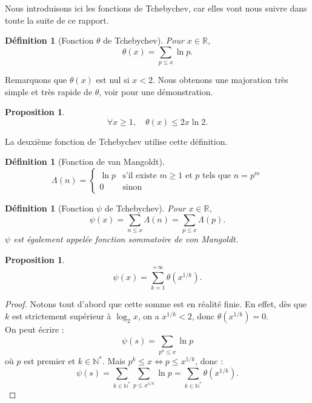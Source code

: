 \documentclass[french]{report}
\newtheorem{definition}[theorem]{Définition}
\newtheorem{proposition}[theorem]{Proposition}
\begin{document}
Nous introduisons ici les fonctions de Tchebychev, car elles vont nous suivre dans toute la suite de ce rapport.

\begin{definition}[Fonction $\theta$ de Tchebychev] Pour $x\in \mathbb{R}$,
  \[ \theta(x) = \sum_{p \le x}\ln p. \]
\end{definition}

Remarquons que $\theta(x)$ est nul si $x<2$. Nous obtenons une majoration très simple et très rapide de $\theta$, voir \cite{hindry} pour une démonstration.

\begin{proposition}\label{prop:theta-majoration}
  \[
    \forall x\geq1,\quad \theta(x)\leq 2x\ln 2.
  \]
\end{proposition}

La deuxième fonction de Tchebychev utilise cette définition.

\begin{definition}[Fonction de van Mangoldt]
  \[
    \Lambda(n)=
    \begin{cases}
      \ln p & \text{s'il existe $m\geq1$ et $p$ tels que $n=p^m$} \\
      0 & \text{sinon}
    \end{cases}
  \]
\end{definition}

\begin{definition}[Fonction $\psi$ de Tchebychev] Pour $x\in \mathbb{R}$,
  \[
    \psi(x)
    = \sum_{n \le x}\Lambda (n)
    = \sum_{p \le x}\Lambda (p).
  \]
  $\psi$ est également appelée fonction sommatoire de von Mangoldt.
\end{definition}

\begin{proposition}
  \[
    \psi(x) = \sum_{k=1}^{+\infty}\theta(x^{1/k}).
  \]
\end{proposition}

\begin{proof}
  Notons tout d'abord que cette somme est en réalité finie. En effet, dès que $k$ est strictement supérieur à $\log_2 x$, on a $x^{1/k}<2$, donc $\theta(x^{1/k})=0$.
  \\

  On peut écrire :
  \[
    \psi(s) = \sum_{p^k\leq x}\ln p  
  \]
  où $p$ est premier et $k\in\mathbb{N}^*$. Mais $p^k\leq x\Leftrightarrow p\leq x^{1/k}$, donc :
  \[
    \psi(s)
    = \sum_{k\in\mathbb{N}^*}\sum_{p\leq x^{1/k}}\ln p 
    = \sum_{k\in\mathbb{N}^*}\theta(x^{1/k}).
  \]
\end{proof}
\end{document}
